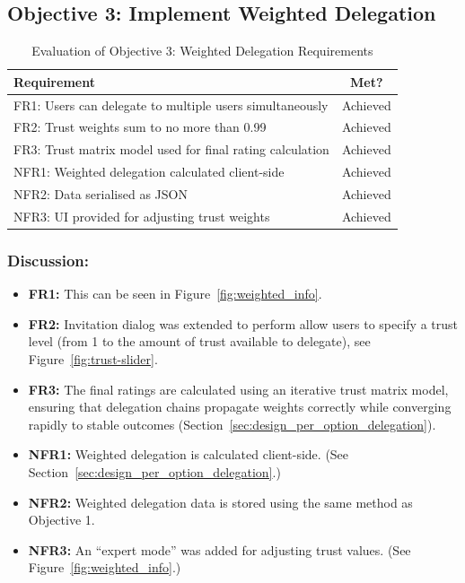 \subsection{Objective 3: Implement Weighted Delegation}

\begin{table}[H]
\centering
\begin{tabular}{|p{9cm}|c|}
\hline
\textbf{Requirement} & \textbf{Met?} \\ \hline
FR1: Users can delegate to multiple users simultaneously & Achieved \\ \hline
FR2: Trust weights sum to no more than 0.99 & Achieved \\ \hline
FR3: Trust matrix model used for final rating calculation & Achieved \\ \hline
NFR1: Weighted delegation calculated client-side & Achieved \\ \hline
NFR2: Data serialised as JSON & Achieved \\ \hline
NFR3: UI provided for adjusting trust weights & Achieved \\ \hline
\end{tabular}
\caption{Evaluation of Objective 3: Weighted Delegation Requirements}
\label{tab:objective3_requirements}
\end{table}

\subsubsection{Discussion:}

\begin{itemize}
    \item \textbf{FR1:} This can be seen in Figure~\ref{fig:weighted_info}.
    \item \textbf{FR2:} Invitation dialog was extended to perform allow users to specify a trust level (from 1 to the amount of trust available to delegate), see Figure~\ref{fig:trust-slider}.
    \item \textbf{FR3:} The final ratings are calculated using an iterative trust matrix model, ensuring that delegation chains propagate weights correctly while converging rapidly to stable outcomes (Section~\ref{sec:design_per_option_delegation}).
    \item \textbf{NFR1:} Weighted delegation is calculated client-side. (See Section~\ref{sec:design_per_option_delegation}.)
    \item \textbf{NFR2:} Weighted delegation data is stored using the same method as Objective 1.
    \item \textbf{NFR3:} An ``expert mode'' was added for adjusting trust values. (See Figure~\ref{fig:weighted_info}.)

\end{itemize}

